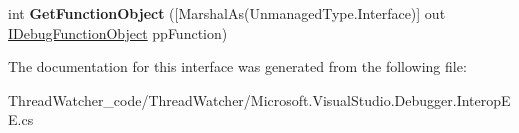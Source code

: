 \begin{DoxyCompactItemize}
\item 
\hypertarget{interface_microsoft_1_1_visual_studio_1_1_debugger_1_1_interop_e_e_1_1_i_debug_binder_af7edb69b083ccbb8e1316eae2e896631}{int {\bfseries Get\+Function\+Object} (\mbox{[}Marshal\+As(Unmanaged\+Type.\+Interface)\mbox{]} out \hyperlink{interface_microsoft_1_1_visual_studio_1_1_debugger_1_1_interop_e_e_1_1_i_debug_function_object}{I\+Debug\+Function\+Object} pp\+Function)}\label{interface_microsoft_1_1_visual_studio_1_1_debugger_1_1_interop_e_e_1_1_i_debug_binder_af7edb69b083ccbb8e1316eae2e896631}

\end{DoxyCompactItemize}


The documentation for this interface was generated from the following file\+:\begin{DoxyCompactItemize}
\item 
Thread\+Watcher\+\_\+code/\+Thread\+Watcher/Microsoft.\+Visual\+Studio.\+Debugger.\+Interop\+E\+E.\+cs\end{DoxyCompactItemize}
